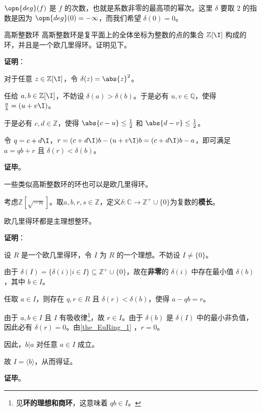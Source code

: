 $\opn{deg}(f)$ 是 $f$ 的次数，也就是系数非零的最高项的幂次。这里 $\delta$ 要取 $2$ 的指数是因为 $\opn{deg}(0)=-\infty$，而我们希望 $\delta(0)=0$。

\begin{example}{高斯整数环}
高斯整数环是复平面上的全体坐标为整数的点的集合 $\mathbb{Z}[\I]$ 构成的环，并且是一个欧几里得环。证明见下。
\end{example}

\textbf{证明}：

对于任意 $z\in\mathbb{Z}[\I]$，令 $\delta(z)=\abs{z}^2$。

任给 $a, b\in\mathbb{Z}[\I]$，不妨设 $\delta(a)>\delta(b)$。于是必有 $u, v\in\mathbb{Q}$，使得 $\frac{a}{b}=(u+v\I)$。

于是必有 $c, d\in\mathbb{Z}$，使得 $\abs{c-u}\leq\frac{1}{2}$ 和 $\abs{d-v}\leq\frac{1}{2}$。

令 $q=c+d\I$，$r=(c+d\I)b-(u+v\I)b=(c+d\I)b-a$，即可满足 $a=qb+r$ 且 $\delta(r)<\delta(b)$。

\textbf{证毕}。


一些类似高斯整数环的环也可以是欧几里得环。



\begin{example}{}\label{ex_EuRing_1}

考虑$\mathbb{Z}[\sqrt{-n}]$。取$a, b, r, s\in\mathbb{Z}$，定义$\delta:\mathbb{C}\to \mathbb{Z}^+\cup\{0\}$为复数的\textbf{模长}。

\end{example}









\begin{theorem}{}
欧几里得环都是主理想整环。
\end{theorem}

\textbf{证明}：

设 $R$ 是一个欧几里得环，令 $I$ 为 $R$ 的一个理想。不妨设 $I\not=\{0\}$。

由于 $\delta(I)=\{\delta(i)|i\in I\}\subseteq\mathbb{Z}^+\cup\{0\}$，故在\textbf{非零}的 $\delta(i)$ 中存在最小值 $\delta(b)$，其中 $b\in I$。

任取 $a\in I$，则存在 $q, r\in R$ 且 $\delta(r)<\delta(b)$，使得 $a-qb=r$。

由于 $a, b\in I$ 且 $I$ 有吸收律\footnote{见\textbf{环的理想和商环}，这意味着 $qb\in I$。}，故 $r\in I$。由于 $\delta(b)$ 是 $\delta(I)$ 中的最小非负值，因此必有 $\delta(r)=0$。由\autoref{the_EuRing_1} ，$r=0$。

因此，$b|a$ 对任意 $a\in I$ 成立。

故 $I=\langle b \rangle$，从而得证。

\textbf{证毕}。



